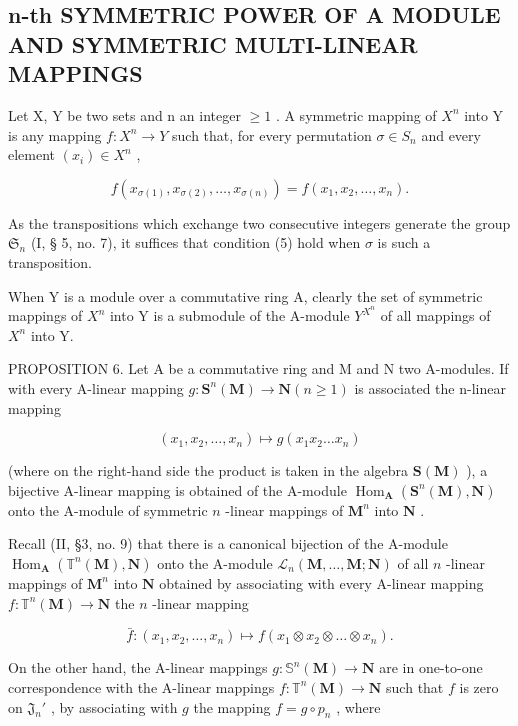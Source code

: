 \subsection{n-th SYMMETRIC POWER OF A MODULE AND SYMMETRIC MULTI-LINEAR MAPPINGS}

Let X, Y be two sets and n an integer \(\geqslant1\) . A symmetric mapping of \(X^{n}\) into Y is any mapping \(f: X^{n} \to Y\) such that, for every permutation \(\sigma \in S_{n}\) and every element \((x_{i}) \in X^{n}\) ,

\[
f (x _ {\sigma (1)}, x _ {\sigma (2)}, \dots , x _ {\sigma (n)}) = f (x _ {1}, x _ {2}, \dots , x _ {n}).\tag{5}
\]

As the transpositions which exchange two consecutive integers generate the group \(\mathfrak{S}_n\) (I, § 5, no. 7), it suffices that condition (5) hold when \(\sigma\) is such a transposition.

When Y is a module over a commutative ring A, clearly the set of symmetric mappings of \(X^{n}\) into Y is a submodule of the A-module \(Y^{X^{n}}\) of all mappings of \(X^{n}\) into Y.

PROPOSITION 6. Let A be a commutative ring and M and N two A-modules. If with every A-linear mapping \(g: \mathbf{S}^n(\mathbf{M}) \to \mathbf{N} (n \geqslant 1)\) is associated the n-linear mapping

\[
\left(x _ {1}, x _ {2}, \dots , x _ {n}\right) \mapsto g \left(x _ {1} x _ {2} \dots x _ {n}\right)\tag{6}
\]

(where on the right-hand side the product is taken in the algebra \(\mathbf{S}(\mathbf{M})\) ), a bijective A-linear mapping is obtained of the A-module \(\operatorname{Hom}_{\mathbf{A}}(\mathbf{S}^{n}(\mathbf{M}), \mathbf{N})\) onto the A-module of symmetric \(n\) -linear mappings of \(\mathbf{M}^{n}\) into \(\mathbf{N}\) .

Recall (II, §3, no. 9) that there is a canonical bijection of the A-module \(\operatorname{Hom}_{\mathbf{A}}(\mathbb{T}^{n}(\mathbf{M}), \mathbf{N})\) onto the A-module \(\mathcal{L}_{n}(\mathbf{M}, \ldots, \mathbf{M}; \mathbf{N})\) of all \(n\) -linear mappings of \(\mathbf{M}^{n}\) into \(\mathbf{N}\) obtained by associating with every A-linear mapping \(f: \mathbb{T}^{n}(\mathbf{M}) \to \mathbf{N}\) the \(n\) -linear mapping

\[
\bar {f} \colon (x _ {1}, x _ {2}, \dots , x _ {n}) \mapsto f (x _ {1} \otimes x _ {2} \otimes \dots \otimes x _ {n}).\tag{7}
\]

On the other hand, the A-linear mappings \(g \colon \mathbb{S}^n(\mathbf{M}) \to \mathbf{N}\) are in one-to-one correspondence with the A-linear mappings \(f \colon \mathbb{T}^n(\mathbf{M}) \to \mathbf{N}\) such that \(f\) is zero on \(\mathfrak{J}_n'\) , by associating with \(g\) the mapping \(f = g \circ p_n\) , where

